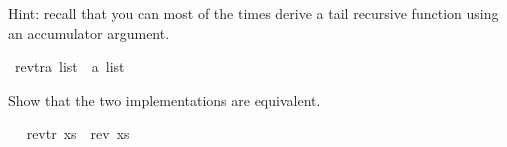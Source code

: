 \begin{isabellebody}
\begin{isamarkuptext}
  Hint: recall that you can most of the times derive a tail recursive function using an accumulator
        argument.%
\end{isamarkuptext}\isamarkuptrue%
\isanewline
\isanewline
\isanewline
{}\isamarkupfalse%
\ rev{\isacharunderscore}{\kern0pt}tr{\isacharcolon}{\kern0pt}{\isacharcolon}{\kern0pt}{\isachardoublequoteopen}{\isacharprime}{\kern0pt}a\ list\ {\isasymRightarrow}\ {\isacharprime}{\kern0pt}a\ list{\isachardoublequoteclose}\ %
\begin{isamarkuptext}%
Show that the two implementations are equivalent.%
\end{isamarkuptext}\isamarkuptrue%
%
\isadelimproof
%
\endisadelimproof
%
\isatagproof
%
\endisatagproof
{\isafoldproof}%
%
\isadelimproof
\ \isanewline
%
\endisadelimproof
{}\isamarkupfalse%
\ {\isachardoublequoteopen}rev{\isacharunderscore}{\kern0pt}tr\ xs\ {\isacharequal}{\kern0pt}\ rev\ xs{\isachardoublequoteclose}%
\isadelimproof
%
\endisadelimproof
%
\isatagproof
%
\endisatagproof
{\isafoldproof}%
%
\isadelimproof
%
\endisadelimproof
%
\isadelimtheory
%
\endisadelimtheory
%
\isatagtheory
%
\endisatagtheory
{\isafoldtheory}%
%
\isadelimtheory
%
\endisadelimtheory
%
\end{isabellebody}%
\endinput

